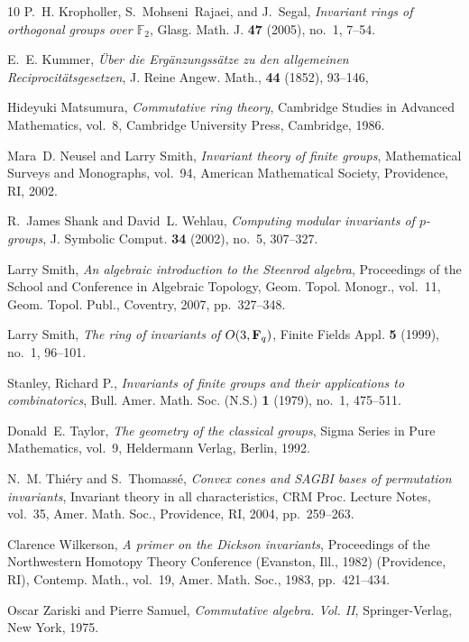 \documentclass{amsart}
\begin{document}
\begin{thebibliography}{10}
P.~H. Kropholler, S.~Mohseni~Rajaei, and J.~Segal, \emph{Invariant rings of
  orthogonal groups over {$\mathbb F_2$}}, Glasg. Math. J. \textbf{47} (2005),
  no.~1, 7--54. 

E.~E. Kummer, \emph{\"{U}ber die {E}rg\"{a}nzungss\"{a}tze zu den allgemeinen
              {R}eciprocit\"{a}tsgesetzen}, J. Reine Angew. Math., \textbf{44} (1852),
    93--146, 

Hideyuki Matsumura, \emph{Commutative ring theory}, Cambridge Studies in
  Advanced Mathematics, vol.~8, Cambridge University Press, Cambridge, 1986.



Mara~D. Neusel and Larry Smith, \emph{Invariant theory of finite groups},
  Mathematical Surveys and Monographs, vol.~94, American Mathematical Society,
  Providence, RI, 2002. 

R.~James Shank and David~L. Wehlau, \emph{Computing modular invariants of
  {$p$}-groups}, J. Symbolic Comput. \textbf{34} (2002), no.~5, 307--327.


Larry Smith, \emph{An algebraic introduction to the {S}teenrod algebra},
  Proceedings of the {S}chool and {C}onference in {A}lgebraic {T}opology, Geom.
  Topol. Monogr., vol.~11, Geom. Topol. Publ., Coventry, 2007, pp.~327--348.

Larry Smith, \emph{The ring of invariants of {${\rm O}(3,{\bf F}_q)$}}, Finite
  Fields Appl. \textbf{5} (1999), no.~1, 96--101. 

    Stanley, Richard P., \emph{Invariants of finite groups and their applications to combinatorics},
    Bull. Amer. Math. Soc. (N.S.)
    \textbf{1} (1979), no.~1, 475--511. 
 
Donald~E. Taylor, \emph{The geometry of the classical groups}, Sigma Series in
  Pure Mathematics, vol.~9, Heldermann Verlag, Berlin, 1992. 

N.~M. Thi{\'e}ry and S.~Thomass{\'e}, \emph{Convex cones and {SAGBI} bases of
  permutation invariants}, Invariant theory in all characteristics, CRM Proc.
  Lecture Notes, vol.~35, Amer. Math. Soc., Providence, RI, 2004, pp.~259--263.


Clarence Wilkerson, \emph{A primer on the {D}ickson invariants}, Proceedings of
  the Northwestern Homotopy Theory Conference (Evanston, Ill., 1982)
  (Providence, RI), Contemp. Math., vol.~19, Amer. Math. Soc., 1983,
  pp.~421--434. 

Oscar Zariski and Pierre Samuel, \emph{Commutative algebra. {V}ol. {II}},
  Springer-Verlag, New York, 1975. 

\end{thebibliography}
\end{document}
